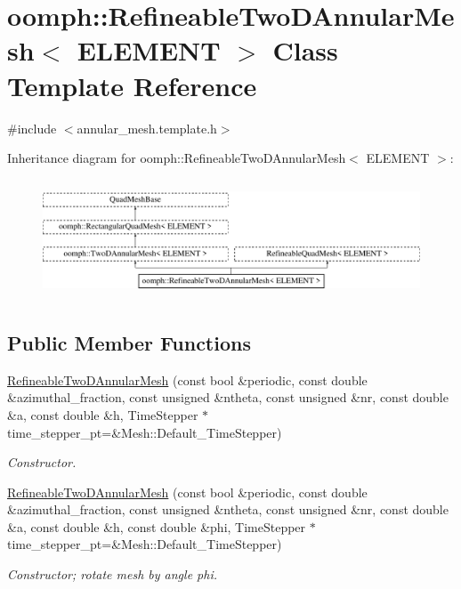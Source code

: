 \hypertarget{classoomph_1_1RefineableTwoDAnnularMesh}{}\section{oomph\+:\+:Refineable\+Two\+D\+Annular\+Mesh$<$ E\+L\+E\+M\+E\+NT $>$ Class Template Reference}
\label{classoomph_1_1RefineableTwoDAnnularMesh}


{\ttfamily \#include $<$annular\+\_\+mesh.\+template.\+h$>$}

Inheritance diagram for oomph\+:\+:Refineable\+Two\+D\+Annular\+Mesh$<$ E\+L\+E\+M\+E\+NT $>$\+:\begin{figure}[H]
\begin{center}
\leavevmode
\includegraphics[height=3.578275cm]{classoomph_1_1RefineableTwoDAnnularMesh}
\end{center}
\end{figure}
\subsection*{Public Member Functions}
\begin{DoxyCompactItemize}
\item 
\hyperlink{classoomph_1_1RefineableTwoDAnnularMesh_ae2ade4a5af04871f53de1906a428d6ff}{Refineable\+Two\+D\+Annular\+Mesh} (const bool \&periodic, const double \&azimuthal\+\_\+fraction, const unsigned \&ntheta, const unsigned \&nr, const double \&a, const double \&h, Time\+Stepper $\ast$time\+\_\+stepper\+\_\+pt=\&Mesh\+::\+Default\+\_\+\+Time\+Stepper)
\begin{DoxyCompactList}\small\item\em Constructor. \end{DoxyCompactList}\item 
\hyperlink{classoomph_1_1RefineableTwoDAnnularMesh_a5efdb906168255f7264ee22a963d7eb6}{Refineable\+Two\+D\+Annular\+Mesh} (const bool \&periodic, const double \&azimuthal\+\_\+fraction, const unsigned \&ntheta, const unsigned \&nr, const double \&a, const double \&h, const double \&phi, Time\+Stepper $\ast$time\+\_\+stepper\+\_\+pt=\&Mesh\+::\+Default\+\_\+\+Time\+Stepper)
\begin{DoxyCompactList}\small\item\em Constructor; rotate mesh by angle phi. \end{DoxyCompactList}\end{DoxyCompactItemize}
